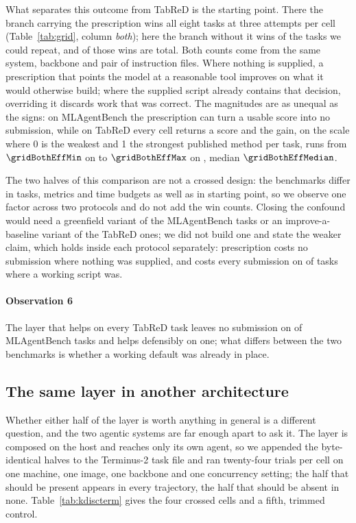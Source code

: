 What separates this outcome from TabReD is the starting point. There the
branch carrying the prescription wins all eight tasks at three attempts per
cell (Table~\ref{tab:grid}, column \emph{both}); here the branch without it
wins \mlabOffWins{} of the \mlabRepeated{} tasks we could repeat, and
\mlabWiped{} of those wins are total. Both counts come from the same system,
backbone and pair of instruction files. Where nothing is supplied, a
prescription that points the model at a reasonable tool improves on what it
would otherwise build; where the supplied script already contains that
decision, overriding it discards work that was correct. The magnitudes are as
unequal as the signs: on MLAgentBench the prescription can turn a usable score
into no submission, while on TabReD every cell returns a score and the gain,
on the scale where 0 is the weakest and 1 the strongest published method per
task, runs from $\gridBothEffMin$ on \texttt{\gridBothEffMinTask} to
$\gridBothEffMax$ on \texttt{\gridBothEffMaxTask}, median
$\gridBothEffMedian$.

The two halves of this comparison are not a crossed design: the benchmarks
differ in tasks, metrics and time budgets as well as in starting point, so we
observe one factor across two protocols and do not add the win counts. Closing
the confound would need a greenfield variant of the MLAgentBench tasks or an
improve-a-baseline variant of the TabReD ones; we did not build one and state
the weaker claim, which holds inside each protocol separately: prescription
costs no submission where nothing was supplied, and costs every submission on
\mlabWiped{} of \mlabRepeated{} tasks where a working script was.

\paragraph{Observation 6} The layer that helps on every TabReD task leaves no
submission on \mlabWiped{} of \mlabRepeated{} MLAgentBench tasks and helps
defensibly on one; what differs between the two benchmarks is whether a working
default was already in place.

\subsection{The same layer in another architecture}
\label{sec:kdiscterm}

Whether either half of the layer is worth anything in general is a different
question, and the two agentic systems are far enough apart to ask it. The
layer is composed on the host and reaches only its own agent, so we appended
the byte-identical halves to the Terminus-2 task file and ran twenty-four
trials per cell on one machine, one image, one backbone and one concurrency
setting; the half that should be present appears in every trajectory, the
half that should be absent in none. Table~\ref{tab:kdiscterm} gives the four
crossed cells and a fifth, trimmed control.

